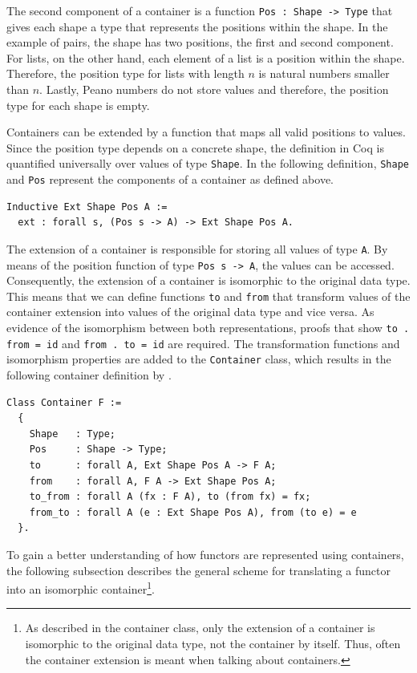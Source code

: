 \documentclass[a4paper, 11pt, fleqn, twoside, abstract=on]{scrreprt}
\newcommand{\hinl}[1]{\texttt{#1}}
\newcommand{\cinl}[1]{\texttt{#1}}
\begin{document}
The second component of a container is a function \cinl{Pos : Shape -> Type} that gives each shape a type that represents the positions within the shape.
In the example of pairs, the shape has two positions, the first and second component.
For lists, on the other hand, each element of a list is a position within the shape.
Therefore, the position type for lists with length $n$ is natural numbers smaller than $n$.
Lastly, Peano numbers do not store values and therefore, the position type for each shape is empty.

Containers can be extended by a function that maps all valid positions to values.
Since the position type depends on a concrete shape, the definition in Coq is quantified universally over values of type \cinl{Shape}.
In the following definition, \cinl{Shape} and \cinl{Pos} represent the components of a container as defined above.

\begin{verbatim}
Inductive Ext Shape Pos A := 
  ext : forall s, (Pos s -> A) -> Ext Shape Pos A.
\end{verbatim}

The extension of a container is responsible for storing all values of type \cinl{A}.
By means of the position function of type \cinl{Pos s -> A}, the values can be accessed.
Consequently, the extension of a container is isomorphic to the original data type.
This means that we can define functions \cinl{to} and \cinl{from} that transform values of the container extension into values of the original data type and vice versa.
As evidence of the isomorphism between both representations, proofs that show \cinl{to . from = id} and \hinl{from . to = id} are required.
The transformation functions and isomorphism properties are added to the \cinl{Container} class, which results in the following container definition by \citet{dylus2019oneMonad}.

\begin{verbatim}
Class Container F :=
  {
    Shape   : Type;
    Pos     : Shape -> Type;
    to      : forall A, Ext Shape Pos A -> F A;
    from    : forall A, F A -> Ext Shape Pos A;
    to_from : forall A (fx : F A), to (from fx) = fx;
    from_to : forall A (e : Ext Shape Pos A), from (to e) = e
  }.
\end{verbatim}

To gain a better understanding of how functors are represented using containers, the following subsection describes the general scheme for translating a functor into an isomorphic container\footnote{As described in the container class, only the extension of a container is isomorphic to the original data type, not the container by itself. Thus, often the container extension is meant when talking about containers.}.
\end{document}
